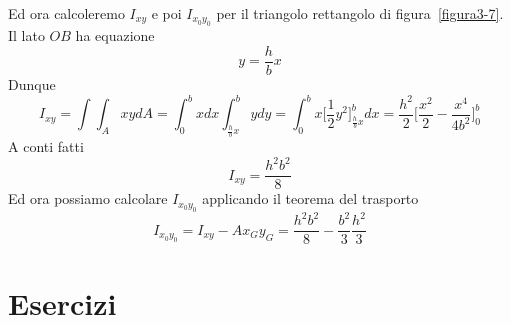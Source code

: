 Ed ora calcoleremo $I_{xy}$ e poi $I_{x_{0}y_{0}}$ per il triangolo rettangolo di figura~\ref{figura3-7}. Il lato $OB$ ha equazione
\begin{equation*}
y = \frac{h}{b}x
\end{equation*}
Dunque 
\begin{equation*}
I_{xy} = \int\int_A xydA = \int_{0}^{b}xdx\int_{\frac{h}{b}x}^{b}ydy = \int_{0}^{b}x\biggl[\frac{1}{2}y^2\biggr]_{\frac{h}{b}x}^{b}\!\!\!\!\!\!dx = \frac{h^2}{2}\Biggl[\frac{x^2}{2}-\frac{x^4}{4b^2}\Biggr]_{0}^{b}
\end{equation*}
A conti fatti
\begin{equation} \label{equazione3-8}
\boxed{I_{xy}=\frac{h^{2}b^{2}}{8}}\tag{3.8}
\end{equation}
Ed ora possiamo calcolare $I_{x_{0}y_{0}}$ applicando il teorema del trasporto
\begin{equation*}
I_{x_{0}y_{0}} = I_{xy} - Ax_{G}y_{G} = \frac{h^{2}b^{2}}{8}-\frac{b^2}{3}\frac{h^2}{3}
\end{equation*}
\clearpage
\section{Esercizi}
